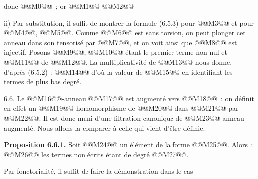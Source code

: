 
donc @@M0@@~; or @@M1@@
@@M2@@

ii) Par substitution, il suffit de montrer la formule (6.5.3) pour @@M3@@ et pour @@M4@@, @@M5@@. Comme @@M6@@ est sans torsion, on peut plonger cet anneau dans son tensorisé par @@M7@@, et on voit ainsi que @@M8@@ est injectif. Posons @@M9@@, @@M10@@ étant le premier terme non nul et @@M11@@ de @@M12@@. La multiplicativité de @@M13@@ nous donne, d'après (6.5.2) :
@@M14@@
d'où la valeur de @@M15@@ en identifiant les termes de plus bas degré.

6.6. Le @@M16@@-anneau @@M17@@ est augmenté vers @@M18@@~: on définit en effet un @@M19@@-homomorphisme de @@M20@@ dans @@M21@@ par @@M22@@. Il est donc muni d'une filtration canonique de @@M23@@-anneau augmenté. Nous allons la comparer à celle qui vient d'être définie.

\textbf{Proposition 6.6.1.} \uline{Soit} @@M24@@ \uline{un élément de la forme} @@M25@@. \uline{Alors} :
@@M26@@
\uline{les termes non écrits} \uline{étant de degré} @@M27@@.

Par fonctorialité, il suffit de faire la démonstration dans le cas 
